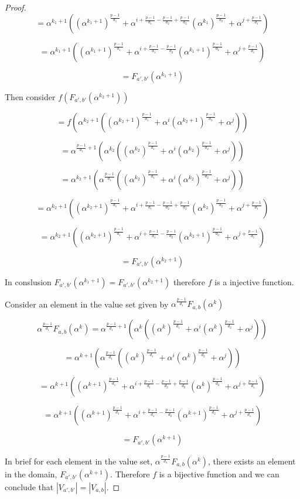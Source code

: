 \documentclass{article}
\theoremstyle{definition}
\theoremstyle{remark}
\numberwithin{equation}{section}
\begin{document}
\begin{proof}
  $$= \alpha^{k_1+1}((\alpha^{k_1+1})^{\frac{p-1}{d_1}} + \alpha^{i + \frac{p-1}{d_1} - \frac{p-1}{d_2} + \frac{p-1}{d_2}}(\alpha^{k_1})^{\frac{p-1}{d_2}} + \alpha^{j + \frac{p-1}{d_1}})$$

  $$= \alpha^{k_1+1}((\alpha^{k_1+1})^{\frac{p-1}{d_1}} + \alpha^{i + \frac{p-1}{d_1} - \frac{p-1}{d_2}}(\alpha^{k_1+1})^{\frac{p-1}{d_2}} + \alpha^{j + \frac{p-1}{d_1}})$$ 

  $$= F_{a', b'}(\alpha^{k_1+1})$$

  Then consider $f(F_{a', b'}(\alpha^{k_2+1}))$

  $$= f(\alpha^{k_2+1}((\alpha^{k_2+1})^{\frac{p-1}{d_1}} + \alpha^{i}(\alpha^{k_2+1})^{\frac{p-1}{d_2}} + \alpha^{j}))$$

  $$ = \alpha^{\frac{p-1}{d_1}+1}(\alpha^{k_2}((\alpha^{k_2})^{\frac{p-1}{d_1}} + \alpha^{i}(\alpha^{k_2})^{\frac{p-1}{d_2}} + \alpha^{j}))$$

  $$ = \alpha^{k_2+1}(\alpha^{\frac{p-1}{d_1}}((\alpha^{k_2})^{\frac{p-1}{d_1}} + \alpha^{i}(\alpha^{k_2})^{\frac{p-1}{d_2}} + \alpha^{j}))$$

  $$ = \alpha^{k_2+1}((\alpha^{k_2 + 1})^{\frac{p-1}{d_1}} + \alpha^{i + \frac{p-1}{d_1} - \frac{p-1}{d_2} + \frac{p-1}{d_2}}(\alpha^{k_2})^{\frac{p-1}{d_2}} + \alpha^{j + \frac{p-1}{d_1}})$$

  $$= \alpha^{k_2+1}((\alpha^{k_2 + 1})^{\frac{p-1}{d_1}} + \alpha^{i + \frac{p-1}{d_1} - \frac{p-1}{d_2}}(\alpha^{k_2 + 1})^{\frac{p-1}{d_2}} + \alpha^{j + \frac{p-1}{d_1}})$$

  $$= F_{a', b'}(\alpha^{k_2+1})$$

  In conslusion $F_{a', b'}(\alpha^{k_1+1}) = F_{a', b'}(\alpha^{k_2+1})$ therefore $f$ is a injective function.

  Consider an element in the value set given by $\alpha^{\frac{p-1}{d_1}}F_{a, b}(\alpha^k)$

  $$\alpha^{\frac{p-1}{d_1}}F_{a, b}(\alpha^k) = \alpha^{\frac{p-1}{d_1}+1}(\alpha^{k}((\alpha^{k})^{\frac{p-1}{d_1}} + \alpha^{i}(\alpha^{k})^{\frac{p-1}{d_2}} + \alpha^{j}))$$

  $$ = \alpha^{k+1}(\alpha^{\frac{p-1}{d_1}}((\alpha^{k})^{\frac{p-1}{d_1}} + \alpha^{i}(\alpha^{k})^{\frac{p-1}{d_2}} + \alpha^{j}))$$

  $$ = \alpha^{k+1}((\alpha^{k + 1})^{\frac{p-1}{d_1}} + \alpha^{i + \frac{p-1}{d_1} - \frac{p-1}{d_2} + \frac{p-1}{d_2}}(\alpha^{k})^{\frac{p-1}{d_2}} + \alpha^{j + \frac{p-1}{d_1}})$$

  $$= \alpha^{k+1}((\alpha^{k + 1})^{\frac{p-1}{d_1}} + \alpha^{i + \frac{p-1}{d_1} - \frac{p-1}{d_2}}(\alpha^{k + 1})^{\frac{p-1}{d_2}} + \alpha^{j + \frac{p-1}{d_1}})$$

  $$= F_{a', b'}(\alpha^{k+1})$$

  In brief for each element in the value set, $\alpha^{\frac{p-1}{d_1}}F_{a, b}(\alpha^k)$, there exists an element in the domain, $F_{a', b'}(\alpha^{k+1})$. Therefore $f$ is a bijective function and we can conclude that $|V_{a', b'}| = |V_{a, b}|$.

\end{proof}
\end{document}
